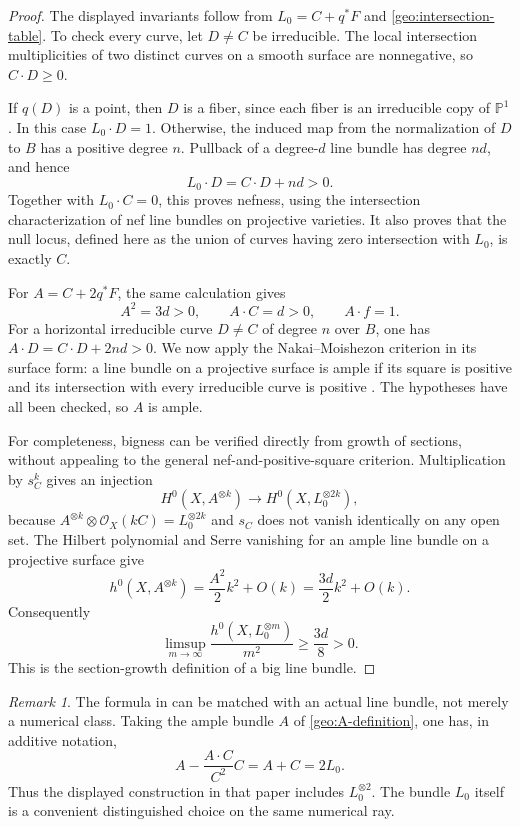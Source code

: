 \documentclass[11pt,a4paper]{article}
\numberwithin{equation}{section}
\theoremstyle{definition}
\theoremstyle{remark}
\newtheorem{remark}[theorem]{Remark}
\renewcommand{\P}{\mathbb P}
\newcommand{\OO}{\mathcal O}
\begin{document}
\begin{proof}
The displayed invariants follow from
$L_0=C+q^*F$ and \eqref{geo:intersection-table}.  To check every
curve, let $D\ne C$ be irreducible.  The local intersection
multiplicities of two distinct curves on a smooth surface are
nonnegative, so $C\cdot D\geq0$.

If $q(D)$ is a point, then $D$ is a fiber, since each fiber is an
irreducible copy of $\P^1$.  In this case $L_0\cdot D=1$.
Otherwise, the induced map from the normalization of $D$ to $B$
has a positive degree $n$.  Pullback of a degree-$d$ line bundle has
degree $nd$, and hence
\[
  L_0\cdot D=C\cdot D+nd>0.
\]
Together with $L_0\cdot C=0$, this proves nefness, using the
intersection characterization of nef line bundles on projective
varieties.  It also proves that the null locus, defined here as the
union of curves having zero intersection with $L_0$, is exactly $C$.

For $A=C+2q^*F$, the same calculation gives
\[
  A^2=3d>0,\qquad A\cdot C=d>0,\qquad A\cdot f=1.
\]
For a horizontal irreducible curve $D\ne C$ of degree $n$ over $B$,
one has $A\cdot D=C\cdot D+2nd>0$.  We now apply the
Nakai--Moishezon criterion in its surface form: a line bundle on a
projective surface is ample if its square is positive and its
intersection with every irreducible curve is positive
\cite{Hartshorne1977,Lazarsfeld2004}.  The hypotheses have all been
checked, so $A$ is ample.

For completeness, bigness can be verified directly from growth of
sections, without appealing to the general nef-and-positive-square
criterion.  Multiplication by $s_C^k$ gives an injection
\[
  H^0(X,A^{\otimes k})
    \longrightarrow H^0(X,L_0^{\otimes 2k}),
\]
because $A^{\otimes k}\otimes\OO_X(kC)=L_0^{\otimes2k}$ and $s_C$
does not vanish identically on any open set.  The Hilbert polynomial
and Serre vanishing for an ample line bundle on a projective surface
give
\[
  h^0(X,A^{\otimes k})=\frac{A^2}{2}k^2+O(k)
                       =\frac{3d}{2}k^2+O(k).
\]
Consequently
\[
  \limsup_{m\to\infty}
    \frac{h^0(X,L_0^{\otimes m})}{m^2}\geq\frac{3d}{8}>0.
\]
This is the section-growth definition of a big line bundle.
\end{proof}

\begin{remark}\label{geo:FT-choice}
The formula in \cite[discussion preceding Problem 2.2]{FilipTosatti2018}
can be matched with an actual line bundle, not merely a numerical
class.  Taking the ample bundle $A$ of \eqref{geo:A-definition}, one
has, in additive notation,
\[
  A-\frac{A\cdot C}{C^2}C=A+C=2L_0.
\]
Thus the displayed construction in that paper includes
$L_0^{\otimes2}$.  The bundle $L_0$ itself is a convenient
distinguished choice on the same numerical ray.
\end{remark}
\end{document}
